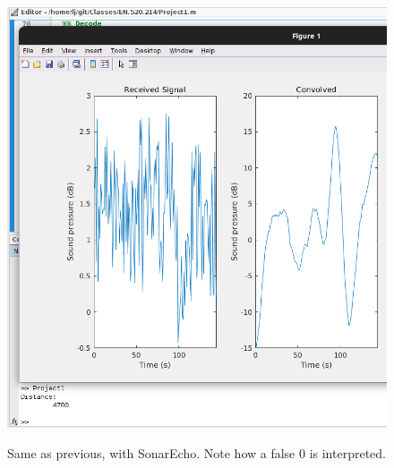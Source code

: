 \documentclass{article}
\begin{document}
\begin{figure}[h]
	\includegraphics[width =\textwidth]{3steprealcode.png}
	\label{3steprealcode}
	\caption{Same as previous, with SonarEcho. Note how a false 0 is interpreted.}
\end{figure}
\end{document}
